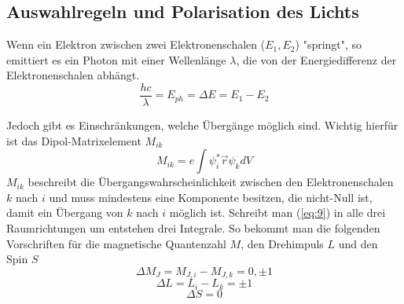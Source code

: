 \subsection{Auswahlregeln und Polarisation des Lichts}
Wenn ein Elektron zwischen zwei Elektronenschalen ($E_1, E_2$) "springt", so emittiert es ein Photon mit einer Wellenlänge $\lambda$, die von der Energiedifferenz der Elektronenschalen abhängt.
\begin{equation} \label{eq:8}
\frac{hc}{\lambda} = E_{ph} = \Delta E = E_1 - E_2
\end{equation}

Jedoch gibt es Einschränkungen, welche Übergänge möglich sind. Wichtig hierfür ist das Dipol-Matrixelement $M_{ik}$
\begin{equation} \label{eq:9}
M_{ik} = e \int \psi_i^* \vec{r} \psi_k dV
\end{equation}
$M_{ik}$ beschreibt die Übergangswahrscheinlichkeit zwischen den Elektronenschalen $k$ nach $i$ und muss mindestens eine Komponente besitzen, die nicht-Null ist, damit ein Übergang von  $k$ nach $i$ möglich ist.
Schreibt man (\ref{eq:9}) in alle drei Raumrichtungen um entstehen drei Integrale. So bekommt man die folgenden Vorschriften für die magnetische Quantenzahl $M$, den Drehimpuls $L$ und den Spin $S$
\begin{equation} \label{eq:10}
\Delta M_J = M_{J,i} - M_{J,k} = 0, \pm 1
\end{equation}
\begin{equation} \label{eq:10}
\Delta L = L_i - L_k = \pm 1
\end{equation}
\begin{equation} \label{eq:10}
\Delta S = 0
\end{equation}

